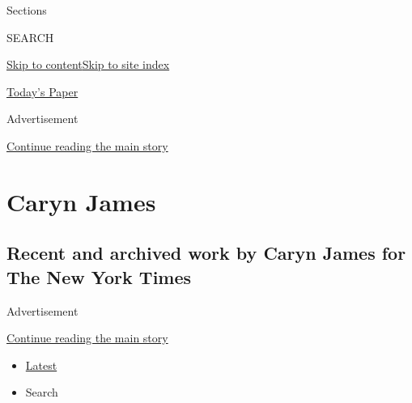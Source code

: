 Sections

SEARCH

\protect\hyperlink{site-content}{Skip to
content}\protect\hyperlink{site-index}{Skip to site index}

\href{https://myaccount.nytimes.com/auth/login?response_type=cookie\&client_id=vi}{}

\href{https://www.nytimes.com/section/todayspaper}{Today's Paper}

Advertisement

\protect\hyperlink{after-top}{Continue reading the main story}

\hypertarget{caryn-james}{%
\section{Caryn James}\label{caryn-james}}

\hypertarget{recent-and-archived-work-by-caryn-james-for-the-new-york-times}{%
\subsection{Recent and archived work by Caryn James for The New York
Times}\label{recent-and-archived-work-by-caryn-james-for-the-new-york-times}}

Advertisement

\protect\hyperlink{after-mid1}{Continue reading the main story}

\begin{itemize}
\tightlist
\item
  \protect\hyperlink{stream-panel}{Latest}
\item
  Search
\end{itemize}

